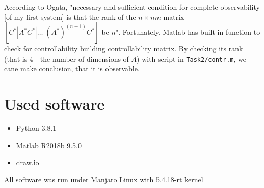 \documentclass[a4paper,12pt]{article}
\begin{document}
According to Ogata, "necessary and sufficient condition for complete observability [of my first system]
is that the rank of the $n\times nm$ matrix $[C^* | A^*C^* | \dots | (A^*)^{(n-1)}C^*]$
be $n$". Fortunately, Matlab has built-in function to check for controllability 
building controllability matrix. By checking its rank (that is 4 - the number of 
dimensions of $A$) with script in \texttt{Task2/contr.m}, we cane make conclusion,
that it is observable.

\section{Used software}
\begin{itemize}
    \item Python 3.8.1
    \item Matlab R2018b 9.5.0
    \item draw.io
\end{itemize}
All software was run under Manjaro Linux with 5.4.18-rt kernel
\end{document}
